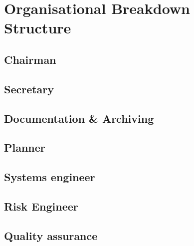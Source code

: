 \section{Organisational Breakdown Structure}\label{cha:OBS}

\subsection{Chairman}\label{par:Chairman}


\subsection{Secretary}\label{par:Secretary}


\subsection{Documentation \& Archiving}\label{par:D_and_A}


\subsection{Planner}\label{par:Planner}


\subsection{Systems engineer}\label{par:SE}


\subsection{Risk Engineer}\label{par:RiskEng}


\subsection{Quality assurance}\label{par:QA}

